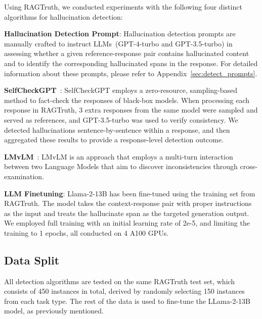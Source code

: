 \documentclass[11pt]{article}
\newcommand{\CorpusName}{RAGTruth}
\begin{document}


Using {\CorpusName}, we conducted experiments with the following four distinct algorithms for hallucination detection:

\noindent \textbf{Hallucination Detection Prompt}: Hallucination detection prompts are manually crafted to instruct LLMs~(GPT-4-turbo and GPT-3.5-turbo) in assessing whether a given reference-response pair contains hallucinated content and to identify the corresponding hallucinated spans in the response. 
For detailed information about these prompts, please refer to Appendix~\ref{sec:detect_prompts}. 





\noindent \textbf{SelfCheckGPT}~\citep{Manakul2023-selfcheckgpt}: SelfCheckGPT employs a zero-resource, sampling-based method to fact-check the responses of black-box models. When processing each response in {\CorpusName}, 3 extra responses from the same model were sampled and served as references, and GPT-3.5-turbo was used to verify consistency. We detected hallucinations sentence-by-sentence within a response, and then aggregated these results to provide a response-level detection outcome.

\noindent \textbf{LMvLM}~\citep{cohen2023lm}: LMvLM is an approach that employs a multi-turn interaction between two Language Models that aim to discover inconsistencies through cross-examination.

\noindent \textbf{LLM Finetuning}: Llama-2-13B has been fine-tuned using the training set from {\CorpusName}. The model takes the context-response pair with proper instructions as the input and treats the hallucinate span as the targeted generation output. We employed full training  with an initial learning rate of 2e-5, and limiting the training to 1 epochs, all conducted on 4 A100 GPUs. 

\subsection{Data Split}
All detection algorithms are tested on the same {\CorpusName} test set, which consists of 450 instances in total, derived by randomly selecting 150 instances from each task type. The rest of the data is used to fine-tune the LLama-2-13B model, as previously mentioned.
\end{document}
